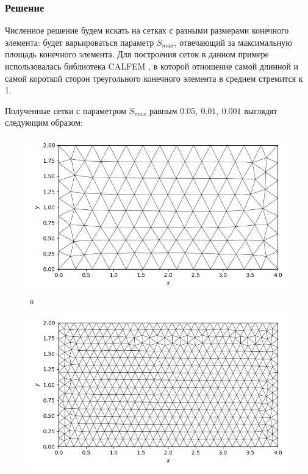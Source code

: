 \documentclass[12pt, a4paper]{article}
\begin{document}
				
				\newpage
				\subsubsection{Решение}
					Численное решение будем искать на сетках с разными размерами конечного элемента: будет варьироваться параметр $S_{max}$, отвечающий за максимальную площадь конечного элемента. 
					Для построения сеток в данном примере использовалась библиотека CALFEM \cite{calfem}, в которой отношение самой длинной и самой короткой сторон треугольного конечного элемента в среднем стремится к 1. 
							
					Полученные сетки с параметром $S_{max}$ равным $0.05, \ 0.01, \ 0.001$ выглядят следующим образом: 
					
										
					\begin{figure}[h]  
						\centering     
						\vspace{5.0mm} 
						\begin{center} 
							{ 
								\begin{minipage}{0.45\textwidth} 
									\centering 
									\includegraphics[width=1\columnwidth]{rect_dirichlet_only_005_calfem_net.png}\\ 
									\textit{a} 
								\end{minipage}                                 
							} 
							{ 
								\begin{minipage}{0.45\textwidth} 
									\centering 
									\includegraphics[width=1\columnwidth]{rect_dirichlet_only_001_calfem_net.png}\\ 

\end{minipage}}
\end{center}
\end{figure}
\end{document}
